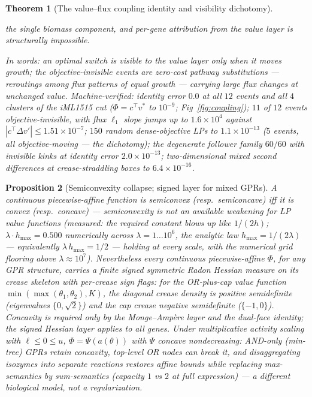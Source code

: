 \documentclass[11pt,a4paper]{article}
\theoremstyle{plain}
\newtheorem{theorem}{Theorem}[section]
\newtheorem{proposition}[theorem]{Proposition}
\theoremstyle{definition}
\theoremstyle{remark}
\begin{document}
\begin{theorem}[The value--flux coupling identity and visibility
dichotomy]
\begin{enumerate}[label=(\roman*),leftmargin=2em]
      the single biomass component, and per-gene attribution from the
      value layer is structurally impossible.
\end{enumerate}
In words: an optimal switch is visible to the value layer only when it
moves growth; the objective-invisible events are zero-cost pathway
substitutions --- reroutings among flux patterns of equal growth ---
carrying large flux changes at unchanged value.
Machine-verified: identity error $0.0$ at all $12$ events and all
$4$ clusters of the iML1515 cut ($\Phi = c^\top v^*$ to $10^{-9}$;
Fig~\ref{fig:coupling});
$11$ of $12$ events objective-invisible, with flux $\ell_1$ slope
jumps up to $1.6 \times 10^{4}$ against $|c^\top \Delta v'| \le
1.51 \times 10^{-7}$; $150$ random dense-objective LPs to $1.1 \times
10^{-13}$ ($5$ events, all objective-moving --- the dichotomy); the
degenerate follower family $60/60$ with invisible kinks at identity
error $2.0 \times 10^{-13}$; two-dimensional mixed second
differences at crease-straddling boxes to $6.4 \times 10^{-16}$.
\end{theorem}

\begin{proposition}[Semiconvexity collapse; signed layer for mixed
GPRs]\label{prop:semiconvex}
A continuous piecewise-affine function is semiconvex (resp.\
semiconcave) iff it is convex (resp.\ concave) --- semiconvexity is
not an available weakening for LP value functions (measured: the
required constant blows up like $1/(2h)$; $\lambda \cdot h_{\max}
= 0.500$ numerically across $\lambda = 1 \dots 10^{6}$, the analytic
law $h_{\max} = 1/(2\lambda)$ --- equivalently $\lambda\,
h_{\max} = 1/2$ --- holding at every scale,
with the numerical grid flooring above $\lambda \approx 10^{7}$).
Nevertheless
every continuous piecewise-affine $\Phi$, for any GPR structure,
carries a finite \emph{signed} symmetric Radon Hessian measure on
its crease skeleton with per-crease sign flags: for the OR-plus-cap
value function $\min(\max(\theta_1,\theta_2), K)$, the diagonal
crease density is positive semidefinite (eigenvalues
$\{0,\sqrt2\}$) and the cap crease negative semidefinite
($\{-1,0\}$). Concavity is required only by the
Monge--Amp\`ere layer and the dual-face identity; the signed Hessian
layer applies to all genes. Under multiplicative activity scaling
with $\ell \le 0 \le u$, $\Phi = \Psi(a(\theta))$ with $\Psi$
concave nondecreasing: AND-only (min-tree) GPRs retain concavity,
top-level OR nodes can break it, and disaggregating isozymes into
separate reactions restores affine bounds while replacing
max-semantics by sum-semantics (capacity $1$ vs $2$ at full
expression) --- a different biological model, not a regularization.
\end{proposition}
\end{document}
